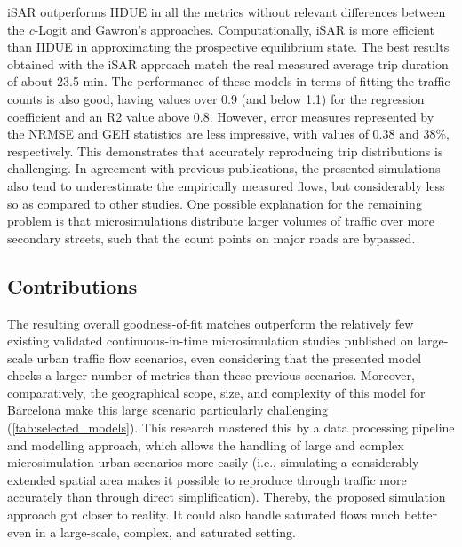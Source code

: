 iSAR outperforms IIDUE in all the metrics without relevant differences between the \emph{c}-Logit and Gawron’s approaches. Computationally, iSAR is more efficient than IIDUE in approximating the prospective equilibrium state. The best results obtained with the iSAR approach match the real measured average trip duration of about 23.5 min. The performance of these models in terms of fitting the traffic counts is also good, having values over 0.9 (and below 1.1) for the regression coefficient and an R2 value above 0.8. However, error measures represented by the NRMSE and GEH statistics are less impressive, with values of 0.38 and 38\%, respectively. This demonstrates that accurately reproducing trip distributions is challenging. In agreement with previous publications, the presented simulations also tend to underestimate the empirically measured flows, but considerably less so as compared to other studies. One possible explanation for the remaining problem is that microsimulations distribute larger volumes of traffic over more secondary streets, such that the count points on major roads are bypassed.

\subsection{Contributions}
The resulting overall goodness-of-fit matches outperform the relatively few existing validated continuous-in-time microsimulation studies published on large-scale urban traffic flow scenarios, even considering that the presented model checks a larger number of metrics than these previous scenarios. Moreover, comparatively, the geographical scope, size, and complexity of this model for Barcelona make this large scenario particularly challenging (\autoref{tab:selected_models}). This research mastered this by a data processing pipeline and modelling approach, which allows the handling of large and complex microsimulation urban scenarios more easily (i.e., simulating a considerably extended spatial area makes it possible to reproduce through traffic more accurately than through direct simplification). Thereby, the proposed simulation approach got closer to reality. It could also handle saturated flows much better even in a large-scale, complex, and saturated setting.



